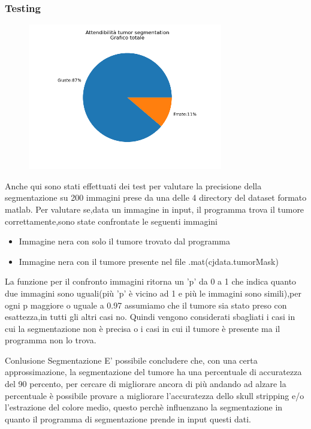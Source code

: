 \documentclass{article}
\begin{document}
\subsubsection{Testing}
\begin{figure}
    \includegraphics[width=8.5cm]{images/ts.png}
\end{figure}
Anche qui sono stati effettuati dei test per valutare la precisione della segmentazione su 200 immagini prese da una delle 4 directory del dataset formato matlab.
Per valutare se,data un immagine in input, il programma trova il tumore correttamente,sono state confrontate le seguenti immagini
\begin{itemize}
    \item Immagine nera con solo il tumore trovato dal programma
    \item Immagine nera con il tumore presente nel file .mat(cjdata.tumorMask)
\end{itemize}
La funzione per il confronto immagini ritorna un 'p' da 0 a 1 che indica quanto due immagini sono uguali(più 'p' è vicino ad 1 e più le immagini sono simili),per ogni p maggiore o uguale a 0.97 assumiamo che il tumore sia stato preso con esattezza,in tutti gli altri casi no.
Quindi vengono considerati sbagliati i casi in cui la segmentazione non è precisa o i casi in cui il tumore è presente ma il programma non lo trova.


\begin{conlusione}{Conlusione Segmentazione}
    E' possibile concludere che, con una certa approssimazione, la segmentazione del tumore ha una
    percentuale di accuratezza del 90 percento, per cercare di migliorare ancora di più andando
    ad alzare la percentuale è possibile provare a migliorare l'accuratezza dello skull stripping 
    e/o l'estrazione del colore medio, questo perchè influenzano la segmentazione in quanto il 
    programma di segmentazione prende in input questi dati.
\end{conlusione}
\end{document}

